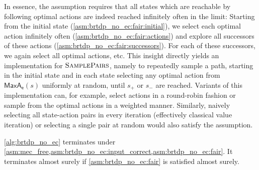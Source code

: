 \documentclass{theoretics}
\newcommand{\targetstate}{s_+}
\newcommand{\sinkstate}{s_-}
\newcommand{\samplepath}{\textsc{SamplePairs}}
\newcommand{\algoepisode}{\mathsf{e}}
\newcommand{\umaxactions}{\mathsf{MaxA}}
\begin{document}
In essence, the assumption requires that all states which are reachable by following optimal actions are indeed reached infinitely often in the limit:
Starting from the initial state (\cref{asm:brtdp_no_ec:fair:initial}), we select each optimal action infinitely often (\cref{asm:brtdp_no_ec:fair:actions}) and explore all successors of these actions (\cref{asm:brtdp_no_ec:fair:successors}).
For each of these successors, we again select all optimal actions, etc.
This insight directly yields an implementation for $\samplepath$, namely to repeatedly sample a path, starting in the initial state and in each state selecting any optimal action from $\umaxactions_\algoepisode(s)$ uniformly at random, until $\targetstate$ or $\sinkstate$ are reached.
Variants of this implementation can, for example, select actions in a round-robin fashion or sample from the optimal actions in a weighted manner.
Similarly, naively selecting all state-action pairs in every iteration (effectively classical value iteration) or selecting a single pair at random would also satisfy the assumption.
\begin{lemma} \label{stm:brtdp:no_ec:termination}
	\cref{alg:brtdp_no_ec} terminates under \cref{asm:mec_free,asm:brtdp_no_ec:input_correct,asm:brtdp_no_ec:fair}.
	It terminates almost surely if \cref{asm:brtdp_no_ec:fair} is satisfied almost surely.
\end{lemma}
\end{document}
